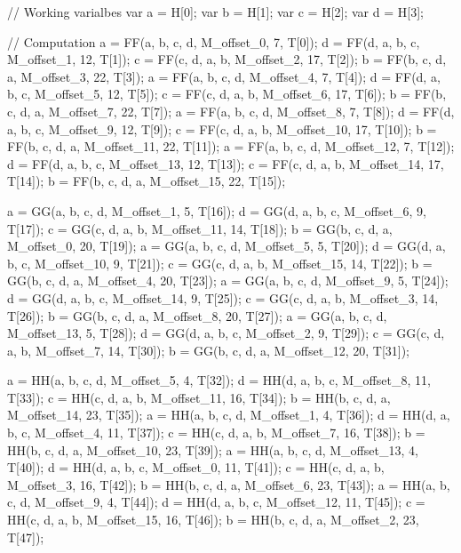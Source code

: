 \begin{DoxyCodeInclude}
            \textcolor{comment}{// Working varialbes}
            var a = H[0];
            var b = H[1];
            var c = H[2];
            var d = H[3];

            \textcolor{comment}{// Computation}
            a = FF(a, b, c, d, M\_offset\_0,  7,  T[0]);
            d = FF(d, a, b, c, M\_offset\_1,  12, T[1]);
            c = FF(c, d, a, b, M\_offset\_2,  17, T[2]);
            b = FF(b, c, d, a, M\_offset\_3,  22, T[3]);
            a = FF(a, b, c, d, M\_offset\_4,  7,  T[4]);
            d = FF(d, a, b, c, M\_offset\_5,  12, T[5]);
            c = FF(c, d, a, b, M\_offset\_6,  17, T[6]);
            b = FF(b, c, d, a, M\_offset\_7,  22, T[7]);
            a = FF(a, b, c, d, M\_offset\_8,  7,  T[8]);
            d = FF(d, a, b, c, M\_offset\_9,  12, T[9]);
            c = FF(c, d, a, b, M\_offset\_10, 17, T[10]);
            b = FF(b, c, d, a, M\_offset\_11, 22, T[11]);
            a = FF(a, b, c, d, M\_offset\_12, 7,  T[12]);
            d = FF(d, a, b, c, M\_offset\_13, 12, T[13]);
            c = FF(c, d, a, b, M\_offset\_14, 17, T[14]);
            b = FF(b, c, d, a, M\_offset\_15, 22, T[15]);

            a = GG(a, b, c, d, M\_offset\_1,  5,  T[16]);
            d = GG(d, a, b, c, M\_offset\_6,  9,  T[17]);
            c = GG(c, d, a, b, M\_offset\_11, 14, T[18]);
            b = GG(b, c, d, a, M\_offset\_0,  20, T[19]);
            a = GG(a, b, c, d, M\_offset\_5,  5,  T[20]);
            d = GG(d, a, b, c, M\_offset\_10, 9,  T[21]);
            c = GG(c, d, a, b, M\_offset\_15, 14, T[22]);
            b = GG(b, c, d, a, M\_offset\_4,  20, T[23]);
            a = GG(a, b, c, d, M\_offset\_9,  5,  T[24]);
            d = GG(d, a, b, c, M\_offset\_14, 9,  T[25]);
            c = GG(c, d, a, b, M\_offset\_3,  14, T[26]);
            b = GG(b, c, d, a, M\_offset\_8,  20, T[27]);
            a = GG(a, b, c, d, M\_offset\_13, 5,  T[28]);
            d = GG(d, a, b, c, M\_offset\_2,  9,  T[29]);
            c = GG(c, d, a, b, M\_offset\_7,  14, T[30]);
            b = GG(b, c, d, a, M\_offset\_12, 20, T[31]);

            a = HH(a, b, c, d, M\_offset\_5,  4,  T[32]);
            d = HH(d, a, b, c, M\_offset\_8,  11, T[33]);
            c = HH(c, d, a, b, M\_offset\_11, 16, T[34]);
            b = HH(b, c, d, a, M\_offset\_14, 23, T[35]);
            a = HH(a, b, c, d, M\_offset\_1,  4,  T[36]);
            d = HH(d, a, b, c, M\_offset\_4,  11, T[37]);
            c = HH(c, d, a, b, M\_offset\_7,  16, T[38]);
            b = HH(b, c, d, a, M\_offset\_10, 23, T[39]);
            a = HH(a, b, c, d, M\_offset\_13, 4,  T[40]);
            d = HH(d, a, b, c, M\_offset\_0,  11, T[41]);
            c = HH(c, d, a, b, M\_offset\_3,  16, T[42]);
            b = HH(b, c, d, a, M\_offset\_6,  23, T[43]);
            a = HH(a, b, c, d, M\_offset\_9,  4,  T[44]);
            d = HH(d, a, b, c, M\_offset\_12, 11, T[45]);
            c = HH(c, d, a, b, M\_offset\_15, 16, T[46]);
            b = HH(b, c, d, a, M\_offset\_2,  23, T[47]);


\end{DoxyCodeInclude}
